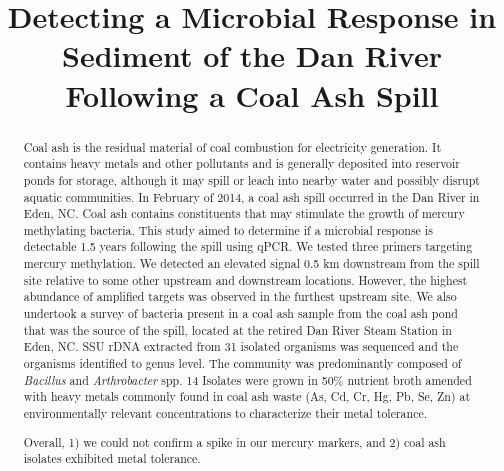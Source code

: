 \documentclass[ms, hidelinks]{uncgdissertationexp3}
\title{Detecting a Microbial Response in Sediment of the Dan River Following a Coal Ash Spill}
\theoremstyle{plain}
\theoremstyle{definition}
\theoremstyle{remark}
\begin{document}
\frontmatter      %

 \begin{abstract}
  Coal ash is the residual material of coal combustion for electricity generation. It contains heavy metals and other pollutants and is generally deposited into reservoir ponds for storage, although it may spill or leach into nearby water and possibly disrupt aquatic communities. In February of 2014, a coal ash spill occurred in the Dan River in Eden, NC. Coal ash contains constituents that may stimulate the growth of mercury methylating bacteria. This study aimed to determine if a microbial response is detectable 1.5 years following the spill using qPCR. We tested three primers targeting mercury methylation. We detected an elevated signal 0.5 km downstream from the spill site relative to some other upstream and downstream locations. However, the highest abundance of amplified targets was observed in the furthest upstream site. We also undertook a survey of bacteria present in a coal ash sample from the coal ash pond that was the source of the spill, located at the retired Dan River Steam Station in Eden, NC. SSU rDNA extracted from 31 isolated organisms was sequenced and the organisms identified to genus level. The community was predominantly composed of \emph{Bacillus} and \emph{Arthrobacter} spp. 14 Isolates were grown in 50\% nutrient broth amended with heavy metals commonly found in coal ash waste (As, Cd, Cr, Hg, Pb, Se, Zn) at environmentally relevant concentrations to characterize their metal tolerance. 

  Overall, 1) we could not confirm a spike in our mercury markers, and 2) coal ash isolates exhibited metal tolerance. 
  
 \end{abstract}

\maketitlepage  

\end{document}

